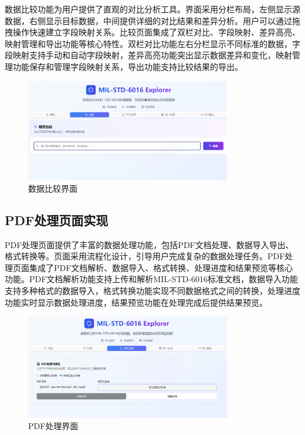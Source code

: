 数据比较功能为用户提供了直观的对比分析工具。界面采用分栏布局，左侧显示源数据，右侧显示目标数据，中间提供详细的对比结果和差异分析。用户可以通过拖拽操作快速建立字段映射关系。比较页面集成了双栏对比、字段映射、差异高亮、映射管理和导出功能等核心特性。双栏对比功能左右分栏显示不同标准的数据，字段映射支持手动和自动字段映射，差异高亮功能突出显示数据差异和变化，映射管理功能保存和管理字段映射关系，导出功能支持比较结果的导出。

\begin{figure}[H]
\centering
\includegraphics[width=0.8\textwidth]{chapters/fig-0/front_compare.png}
\caption{数据比较界面}
\label{fig:frontend-compare}
\end{figure}

\subsection{PDF处理页面实现}

PDF处理页面提供了丰富的数据处理功能，包括PDF文档处理、数据导入导出、格式转换等。页面采用流程化设计，引导用户完成复杂的数据处理任务。PDF处理页面集成了PDF文档解析、数据导入、格式转换、处理进度和结果预览等核心功能。PDF文档解析功能支持上传和解析MIL-STD-6016标准文档，数据导入功能支持多种格式的数据导入，格式转换功能实现不同数据格式之间的转换，处理进度功能实时显示数据处理进度，结果预览功能在处理完成后提供结果预览。

\begin{figure}[H]
\centering
\includegraphics[width=0.8\textwidth]{chapters/fig-0/front_pdfprocess.png}
\caption{PDF处理界面}
\label{fig:frontend-pdfprocess}
\end{figure}

